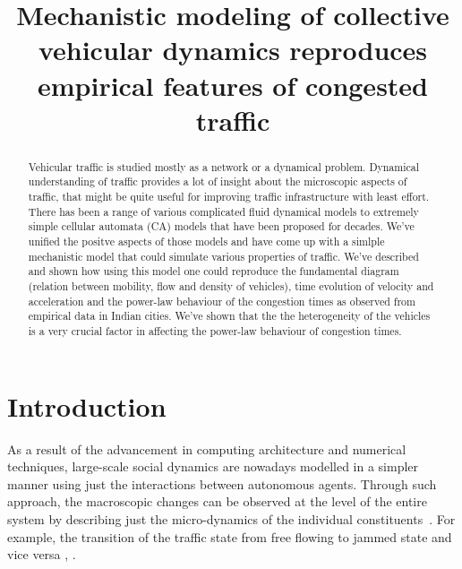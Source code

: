\documentclass[conference]{IEEEtran}
\begin{document}
\title{Mechanistic modeling of collective vehicular dynamics reproduces empirical features of congested traffic}

\author{
}

\maketitle


\begin{abstract}
Vehicular traffic is studied mostly as a network or a dynamical problem. Dynamical understanding of traffic provides a lot of insight about the microscopic aspects of traffic, that might be quite useful for improving traffic infrastructure with least effort. There has been a range of various complicated fluid dynamical models to extremely simple cellular automata (CA) models that have been proposed for decades. We've unified the positve aspects of those models and have come up with a simlple mechanistic model that could simulate various properties of traffic. We've described and shown how using this model one could reproduce the fundamental diagram (relation between mobility, flow and density of vehicles), time evolution of velocity and acceleration and the power-law behaviour of the congestion times as observed from empirical data in Indian cities. We've shown that the the heterogeneity of the vehicles is a very crucial factor in affecting the power-law behaviour of congestion times.

\end{abstract}

\IEEEpeerreviewmaketitle


\section{Introduction}

As a result of the advancement in computing architecture and numerical techniques, large-scale social dynamics are nowadays modelled in a simpler manner using just the interactions between autonomous agents. Through such approach, the macroscopic changes can be observed at the level of the entire system by describing just the micro-dynamics of the individual constituents~\cite{Ball2003}. For example, the transition of the traffic state from free flowing to jammed state and vice versa \cite{Helbing2001}, \cite{Chakrabarti2007}.
\end{document}
